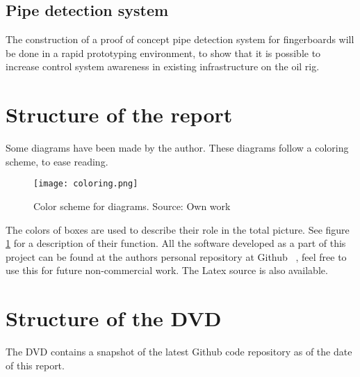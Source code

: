 \subsection{Pipe detection system}
The construction of a proof of concept pipe detection system for fingerboards will be done in a rapid prototyping environment, to show that it is possible to increase control system awareness in existing infrastructure on the oil rig.

\section{Structure of the report}
Some diagrams have been made by the author. These diagrams follow a coloring scheme, to ease reading.

\begin{figure}[ht]
    \centering
    \texttt{[image: coloring.png]}
    \caption{Color scheme for diagrams. Source: Own work}
    \label{fig:coloring}
\end{figure}
\FloatBarrier

The colors of boxes are used to describe their role in the total picture. See figure \ref{fig:coloring} for a description of their function.
All the software developed as a part of this project can be found at the authors personal repository at Github ~\cite{github}, feel free to use this for future non-commercial work. The Latex source is also available.

\section{Structure of the DVD}
The DVD contains a snapshot of the latest Github code repository as of the date of this report.